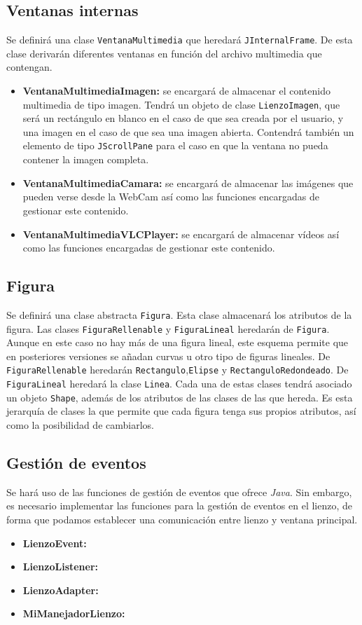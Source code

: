 \subsection{Ventanas internas}
Se definirá una clase \texttt{VentanaMultimedia} que heredará \texttt{JInternalFrame}. De esta clase derivarán diferentes ventanas en función del archivo multimedia que contengan.
\begin{itemize}
\item{\textbf{VentanaMultimediaImagen:} se encargará de almacenar el contenido multimedia de tipo imagen. Tendrá un objeto de clase \texttt{LienzoImagen}, que será un rectángulo en blanco en el caso de que sea creada por el usuario, y una imagen en el caso de que sea una imagen abierta. Contendrá también un elemento de tipo 	\texttt{JScrollPane} para el caso en que la ventana no pueda contener la imagen completa.}
\item{\textbf{VentanaMultimediaCamara:} se encargará de almacenar las imágenes que pueden verse desde la WebCam así como las funciones encargadas de gestionar este contenido.}
\item{\textbf{VentanaMultimediaVLCPlayer:} se encargará de almacenar vídeos así como las funciones encargadas de gestionar este contenido.}
\end{itemize}
\subsection{Figura}
Se definirá una clase abstracta \texttt{Figura}. Esta clase almacenará los atributos de la figura. Las clases \texttt{FiguraRellenable} y \texttt{FiguraLineal} heredarán de \texttt{Figura}. Aunque en este caso no hay más de una figura lineal, este esquema permite que en posteriores versiones se añadan curvas u otro tipo de figuras lineales. De \texttt{FiguraRellenable} heredarán \texttt{Rectangulo},\texttt{Elipse} y \texttt{RectanguloRedondeado}. De \texttt{FiguraLineal} heredará la clase \texttt{Linea}. Cada una de estas clases tendrá asociado un objeto \texttt{Shape}, además de los atributos de las clases de las que hereda.\vskip0.3cm
Es esta jerarquía de clases la que permite que cada figura tenga sus propios atributos, así como la posibilidad de cambiarlos.
\subsection{Gestión de eventos}
Se hará uso de las funciones de gestión de eventos que ofrece \textit{Java}. Sin embargo, es necesario implementar las funciones para la gestión de eventos en el lienzo, de forma que podamos establecer una comunicación entre lienzo y ventana principal.
\begin{itemize}
\item{\textbf{LienzoEvent:}}
\item{\textbf{LienzoListener:}}
\item{\textbf{LienzoAdapter:}}
\item{\textbf{MiManejadorLienzo:}}
\end{itemize}
